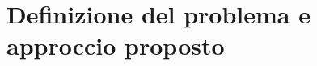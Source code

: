 \chapter{Definizione del problema e approccio proposto}\label{cha:Definizione_del_problema_e_approccio_proposto}



%